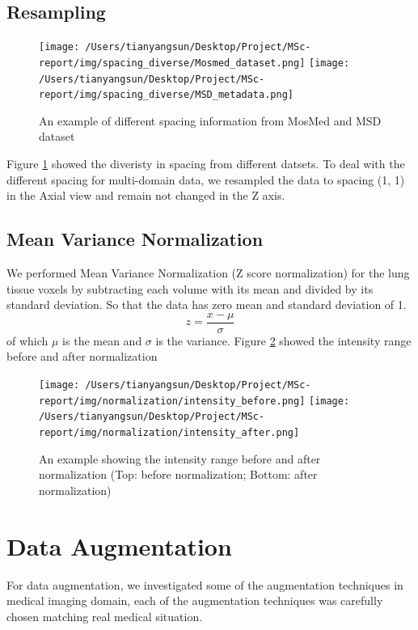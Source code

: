 \subsection{Resampling}
\begin{figure}[h]
	\centering
	\texttt{[image: /Users/tianyangsun/Desktop/Project/MSc-report/img/spacing\_diverse/Mosmed\_dataset.png]}
	\texttt{[image: /Users/tianyangsun/Desktop/Project/MSc-report/img/spacing\_diverse/MSD\_metadata.png]}
	\caption{An example of different spacing information from MosMed and MSD dataset}
	\label{fig:Spacediverse}
\end{figure}
Figure \ref{fig:Spacediverse} showed the diveristy in spacing from different datsets. To deal with the different spacing for multi-domain data, we resampled the data to spacing (1, 1) in the Axial view and remain not changed in the Z axis.

\subsection{Mean Variance Normalization}
We performed Mean Variance Normalization (Z score normalization) for the lung tissue voxels by subtracting each volume with its mean and divided by its standard deviation. So that the data has zero mean and standard deviation of 1. 
$$z=\frac{x-\mu}{\sigma}$$ of which $\mu$ is the mean and $\sigma$ is the variance. Figure \ref{fig:normalization} showed the intensity range before and after normalization

\begin{figure}[h]
	\centering
	\texttt{[image: /Users/tianyangsun/Desktop/Project/MSc-report/img/normalization/intensity\_before.png]}
	\texttt{[image: /Users/tianyangsun/Desktop/Project/MSc-report/img/normalization/intensity\_after.png]}
	\caption{An example showing the intensity range before and after normalization (Top: before normalization; Bottom: after normalization)}
	\label{fig:normalization}
\end{figure}

\newpage
\section{Data Augmentation}
For data augmentation, we investigated some of the augmentation techniques in medical imaging domain, each of the augmentation techniques was carefully chosen matching real medical situation.\\


